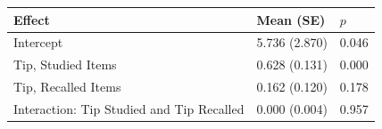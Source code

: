\begin{table} 
\begin{tabular}{lll} 
Effect & Mean (SE) & $p$  \\ \hline 
Intercept & 5.736 (2.870) & 0.046 \\ \hline 
Tip, Studied Items & 0.628 (0.131) & 0.000 \\ \hline 
Tip, Recalled Items & 0.162 (0.120) & 0.178 \\ \hline 
Interaction: Tip Studied and Tip Recalled & 0.000 (0.004) & 0.957 \\ \hline 
\end{tabular} 
\end{table} 
